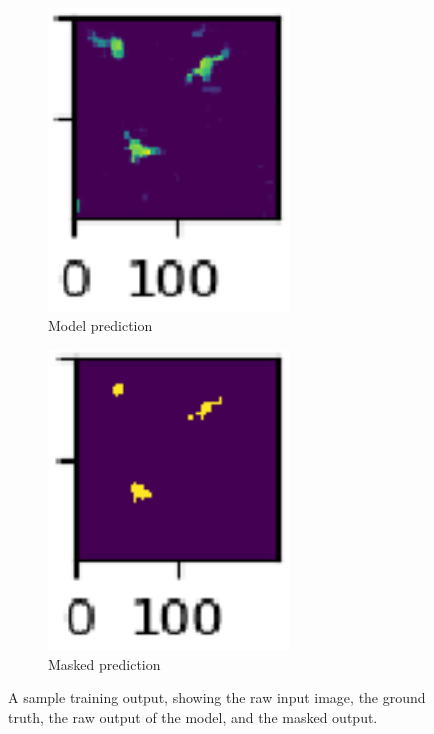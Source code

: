 \documentclass{article}
\begin{document}
\begin{figure}[ht]
\begin{subfigure}{0.2\textwidth}
  \end{subfigure}%
  \begin{subfigure}{0.2\textwidth}
    \includegraphics[width=0.7\textwidth]{training-sample-pred.png}
    \centering
    \caption{Model prediction}
  \end{subfigure}%
  \begin{subfigure}{0.2\textwidth}
    \includegraphics[width=0.7\textwidth]{training-sample-masked.png}
    \centering
    \caption{Masked prediction}
  \end{subfigure}
  \centering
  \captionsetup{width=0.9\textwidth}
  \caption{A sample training output, showing the raw input image, the ground 
  truth, the raw output of the model, and the masked output.}
  \label{fig:training-sample}
\end{figure}
\end{document}

